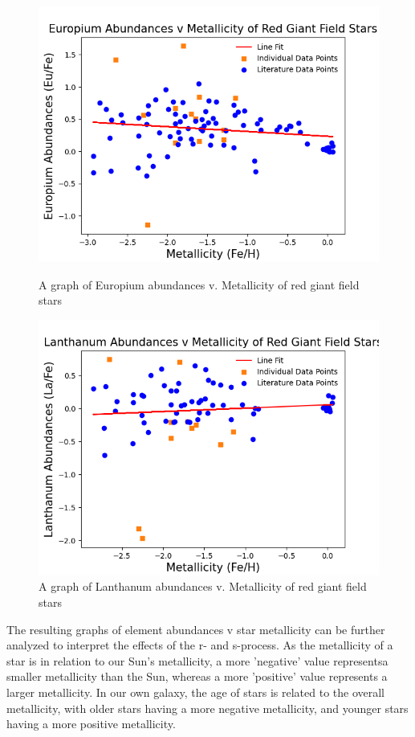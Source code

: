 \begin{figure}[H]
  \includegraphics[width=\textwidth]{Eu_v_Metal.png}
  \caption{A graph of Europium abundances v. Metallicity of red giant field stars}
  \label{Eu_v_Metal}
  
  \includegraphics[width=\textwidth]{La_v_Metal.png}
  \caption{A graph of Lanthanum abundances v. Metallicity of red giant field stars}
  \label{La_v_Metal}
\end{figure}

The resulting graphs of element abundances v star metallicity can be further analyzed to interpret the effects of the r- and s-process. As the metallicity of a star is in relation to our Sun's metallicity, a more 'negative' value representsa smaller metallicity than the Sun, whereas a more 'positive' value represents a larger metallicity. In our own galaxy, the age of stars is related to the overall metallicity, with older stars having a more negative metallicity, and younger stars having a more positive metallicity.

